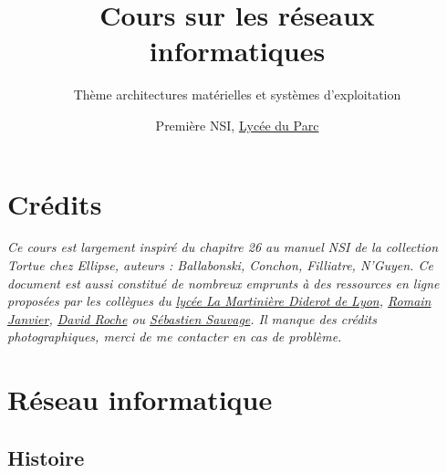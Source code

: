 \documentclass[
  11pt,
]{article}
\title{Cours sur les réseaux informatiques}
\subtitle{Thème architectures matérielles et systèmes d'exploitation}
\author{Première NSI, \href{https://frederic-junier.org/}{Lycée du
Parc}}
\date{}
\newcounter{prop}
\newcounter{cours}
\newcounter{histo}
\begin{document}
\maketitle

\renewcommand*\contentsname{Table des matières}
{
\hypersetup{linkcolor=}
\setcounter{tocdepth}{3}
\tableofcontents
}
\hypertarget{cruxe9dits}{%
\section*{Crédits}\label{cruxe9dits}}

\emph{Ce cours est largement inspiré du chapitre 26 au manuel NSI de la
collection Tortue chez Ellipse, auteurs : Ballabonski, Conchon,
Filliatre, N'Guyen. Ce document est aussi constitué de nombreux emprunts
à des ressources en ligne proposées par les collègues du
\href{http://portail.lyc-la-martiniere-diderot.ac-lyon.fr/srv1/co/Div_6_Archi_OS_3.html}{lycée
La Martinière Diderot de Lyon},
\href{http://archives.janviercommelemois.fr/nsi/fichiers_pdf/feuille-internet.pdf}{Romain
Janvier},
\href{https://pixees.fr/informatiquelycee/n_site/nsi_prem.html}{David
Roche} ou \href{https://sebsauvage.net/}{Sébastien Sauvage}. Il manque
des crédits photographiques, merci de me contacter en cas de problème.}

\hypertarget{ruxe9seau-informatique}{%
\section{Réseau informatique}\label{ruxe9seau-informatique}}

\hypertarget{histoire}{%
\subsection{Histoire}\label{histoire}}
\end{document}

